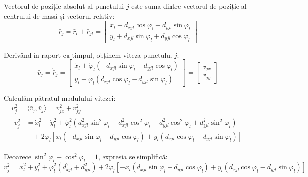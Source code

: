 \documentclass[12pt, a4paper]{article}
\begin{document}
Vectorul de poziție absolut al punctului $j$ este suma dintre vectorul de poziție al centrului de masă și vectorul relativ:
\begin{equation}
    \bar{r}_j = \bar{r}_l + \bar{r}_{jl} = 
    \begin{bmatrix}
        x_l + d_{xjl}\cos\varphi_l - d_{yjl}\sin\varphi_l \\
        y_l + d_{xjl}\sin\varphi_l + d_{yjl}\cos\varphi_l
    \end{bmatrix}
\end{equation}

Derivând în raport cu timpul, obținem viteza punctului $j$:
\begin{equation}
    \bar{v}_j = \dot{\bar{r}}_j = 
    \begin{bmatrix}
        \dot{x}_l + \dot{\varphi}_l(-d_{xjl}\sin\varphi_l - d_{yjl}\cos\varphi_l) \\
        \dot{y}_l + \dot{\varphi}_l(d_{xjl}\cos\varphi_l - d_{yjl}\sin\varphi_l)
    \end{bmatrix}
    = 
    \begin{bmatrix}
        v_{jx} \\
        v_{jy}
    \end{bmatrix}
\end{equation}

Calculăm pătratul modulului vitezei:
\begin{equation}
    \begin{gathered}
        v_j^2 = \langle\bar{v}_j, \bar{v}_j\rangle = v_{jx}^2 + v_{jy}^2 \\
        \begin{aligned}
            v_j^2 &= \dot{x}_l^2 + \dot{y}_l^2 + \dot{\varphi}_l^2(d_{xjl}^2\sin^2\varphi_l + d_{xjl}^2\cos^2\varphi_l + d_{yjl}^2\cos^2\varphi_l + d_{yjl}^2\sin^2\varphi_l) \\
            &\quad + 2\dot{\varphi}_l[\dot{x}_l(-d_{xjl}\sin\varphi_l - d_{yjl}\cos\varphi_l) + \dot{y}_l(d_{xjl}\cos\varphi_l - d_{yjl}\sin\varphi_l)]
        \end{aligned}
    \end{gathered}
\end{equation}

Deoarece $\sin^2\varphi_l + \cos^2\varphi_l = 1$, expresia se simplifică:
\begin{equation}
    v_j^2 = \dot{x}_l^2 + \dot{y}_l^2 + \dot{\varphi}_l^2(d_{xjl}^2 + d_{yjl}^2) + 2\dot{\varphi}_l[-\dot{x}_l(d_{xjl}\sin\varphi_l + d_{yjl}\cos\varphi_l) + \dot{y}_l(d_{xjl}\cos\varphi_l - d_{yjl}\sin\varphi_l)]
\end{equation}
\end{document}
